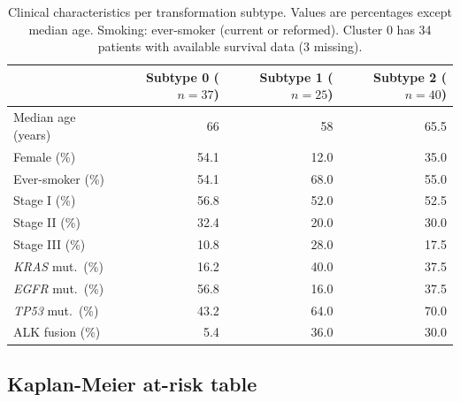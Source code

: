 \begin{table}[htbp]
    \centering
    \caption{Clinical characteristics per transformation subtype. Values are
    percentages except median age. Smoking: ever-smoker (current or reformed).
    Cluster 0 has 34 patients with available survival data (3 missing).}
    \label{tab:app_clinical}
    \begin{tabular}{lrrr}
        \toprule
        & Subtype 0 ($n = 37$) & Subtype 1 ($n = 25$) & Subtype 2 ($n = 40$) \\
        \midrule
        Median age (years)      & 66   & 58   & 65.5 \\
        Female (\%)             & 54.1 & 12.0 & 35.0 \\
        Ever-smoker (\%)        & 54.1 & 68.0 & 55.0 \\
        \midrule
        Stage I (\%)            & 56.8 & 52.0 & 52.5 \\
        Stage II (\%)           & 32.4 & 20.0 & 30.0 \\
        Stage III (\%)          & 10.8 & 28.0 & 17.5 \\
        \midrule
        \textit{KRAS} mut.\ (\%)   & 16.2 & 40.0 & 37.5 \\
        \textit{EGFR} mut.\ (\%)   & 56.8 & 16.0 & 37.5 \\
        \textit{TP53} mut.\ (\%)   & 43.2 & 64.0 & 70.0 \\
        ALK fusion (\%)            &  5.4 & 36.0 & 30.0 \\
        \bottomrule
    \end{tabular}
\end{table}

\subsection{Kaplan-Meier at-risk table}


